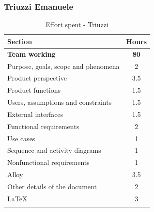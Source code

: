 \documentclass[a4paper,oneside,11pt]{book}   %
\begin{document}
    \subsubsection{Triuzzi Emanuele}
    \begin{longtable}[c]{|V{.55\textwidth}|c|}
        \hline
        \textbf{Section} & {\bfseries{Hours}} \\ \hline
        \textbf{Team working} & \textbf{80} \\ \hline
        Purpose, goals, scope and phenomena & 2 \\ \hline
        Product perspective & 3.5 \\ \hline
        Product functions & 1.5 \\ \hline
        Users, assumptions and constraints & 1.5 \\ \hline
        External interfaces & 1.5 \\ \hline
        Functional requirements & 2 \\ \hline
        Use cases & 1 \\ \hline
        Sequence and activity diagrams & 1 \\ \hline
        Nonfunctional requirements & 1 \\ \hline
        Alloy & 3.5 \\ \hline
        Other details of the document & 2 \\ \hline
        \LaTeX & 3 \\
        \hline
        \caption{Effort spent - Triuzzi}
        \label{table:effort_triuzzi}
    \end{longtable}

\listoftables
\listoffigures
\end{document}
